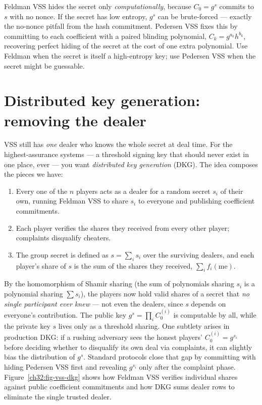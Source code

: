 \begin{trapbox}
Feldman VSS hides the secret only \emph{computationally}, because $C_0 = g^s$ commits to $s$ with no nonce. If the secret has low entropy, $g^s$ can be brute-forced --- exactly the no-nonce pitfall from the hash commitment. Pedersen VSS fixes this by committing to each coefficient with a paired blinding polynomial, $C_k = g^{a_k} h^{b_k}$, recovering perfect hiding of the secret at the cost of one extra polynomial. Use Feldman when the secret is itself a high-entropy key; use Pedersen VSS when the secret might be guessable.
\end{trapbox}

\section{Distributed key generation: removing the dealer}
\label{ch32:dkg}

VSS still has \emph{one} dealer who knows the whole secret at deal time. For the highest-assurance systems --- a threshold signing key that should never exist in one place, ever --- you want \emph{distributed key generation} (DKG). The idea composes the pieces we have:

\begin{enumerate}
  \item Every one of the $n$ players acts as a dealer for a random secret $s_i$ of their own, running Feldman VSS to share $s_i$ to everyone and publishing coefficient commitments.
  \item Each player verifies the shares they received from every other player; complaints disqualify cheaters.
  \item The group secret is defined as $s = \sum_i s_i$ over the surviving dealers, and each player's share of $s$ is the sum of the shares they received, $\sum_i f_i(\text{me})$.
\end{enumerate}

By the homomorphism of Shamir sharing (the sum of polynomials sharing $s_i$ is a polynomial sharing $\sum s_i$), the players now hold valid shares of a secret that \emph{no single participant ever knew} --- not even the dealers, since $s$ depends on everyone's contribution. The public key $g^s = \prod_i C_0^{(i)}$ is computable by all, while the private key $s$ lives only as a threshold sharing. One subtlety arises in production DKG: if a rushing adversary sees the honest players' $C_0^{(i)} = g^{s_i}$ before deciding whether to disqualify its own deal via complaints, it can slightly bias the distribution of $g^s$. Standard protocols close that gap by committing with hiding Pedersen VSS first and revealing $g^{s_i}$ only after the complaint phase. Figure~\ref{ch32:fig-vss-dkg} shows how Feldman VSS verifies individual shares against public coefficient commitments and how DKG sums dealer rows to eliminate the single trusted dealer.


